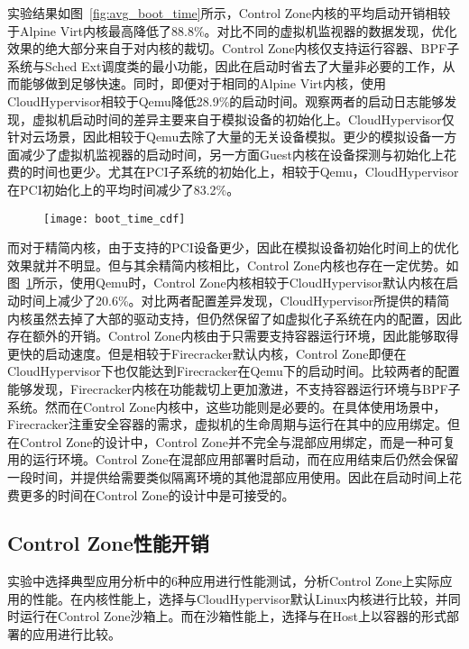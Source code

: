 实验结果如图~\ref{fig:avg_boot_time}所示，Control Zone内核的平均启动开销相较于Alpine Virt内核最高降低了88.8\%。对比不同的虚拟机监视器的数据发现，优化效果的绝大部分来自于对内核的裁切。Control Zone内核仅支持运行容器、BPF子系统与Sched Ext调度类的最小功能，因此在启动时省去了大量非必要的工作，从而能够做到足够快速。同时，即便对于相同的Alpine Virt内核，使用CloudHypervisor相较于Qemu降低28.9\%的启动时间。观察两者的启动日志能够发现，虚拟机启动时间的差异主要来自于模拟设备的初始化上。CloudHypervisor仅针对云场景，因此相较于Qemu去除了大量的无关设备模拟。更少的模拟设备一方面减少了虚拟机监视器的启动时间，另一方面Guest内核在设备探测与初始化上花费的时间也更少。尤其在PCI子系统的初始化上，相较于Qemu，CloudHypervisor在PCI初始化上的平均时间减少了83.2\%。

\begin{figure}[!htbp]
    \centering
    \texttt{[image: boot\_time\_cdf]}
    \label{fig:boot_time_cdf}
\end{figure}

而对于精简内核，由于支持的PCI设备更少，因此在模拟设备初始化时间上的优化效果就并不明显。但与其余精简内核相比，Control Zone内核也存在一定优势。如图~\ref{fig:boot_time_cdf}所示，使用Qemu时，Control Zone内核相较于CloudHypervisor默认内核在启动时间上减少了20.6\%。对比两者配置差异发现，CloudHypervisor所提供的精简内核虽然去掉了大部的驱动支持，但仍然保留了如虚拟化子系统在内的配置，因此存在额外的开销。Control Zone内核由于只需要支持容器运行环境，因此能够取得更快的启动速度。但是相较于Firecracker默认内核，Control Zone即便在CloudHypervisor下也仅能达到Firecracker在Qemu下的启动时间。比较两者的配置能够发现，Firecracker内核在功能裁切上更加激进，不支持容器运行环境与BPF子系统。然而在Control Zone内核中，这些功能则是必要的。在具体使用场景中，Firecracker注重安全容器的需求，虚拟机的生命周期与运行在其中的应用绑定。但在Control Zone的设计中，Control Zone并不完全与混部应用绑定，而是一种可复用的运行环境。Control Zone在混部应用部署时启动，而在应用结束后仍然会保留一段时间，并提供给需要类似隔离环境的其他混部应用使用。因此在启动时间上花费更多的时间在Control Zone的设计中是可接受的。

\subsection{Control Zone性能开销}

实验中选择典型应用分析中的6种应用进行性能测试，分析Control Zone上实际应用的性能。在内核性能上，选择与CloudHypervisor默认Linux内核进行比较，并同时运行在Control Zone沙箱上。而在沙箱性能上，选择与在Host上以容器的形式部署的应用进行比较。

